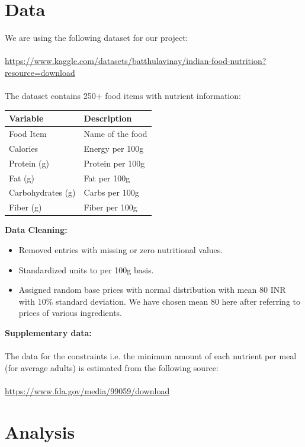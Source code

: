 \documentclass{article}
\begin{document}
\section*{Data}
We are using the following dataset for our project:\\
\\
\href{https://www.kaggle.com/datasets/batthulavinay/indian-food-nutrition?resource=download}{https://www.kaggle.com/datasets/batthulavinay/indian-food-nutrition?resource=download}\\
\\
The dataset contains 250+ food items with nutrient information:
\begin{center}
\begin{tabular}{ll}
\toprule
\textbf{Variable} & \textbf{Description} \\
\midrule
Food Item & Name of the food \\
Calories & Energy per 100g \\
Protein (g) & Protein per 100g \\
Fat (g) & Fat per 100g \\
Carbohydrates (g) & Carbs per 100g \\
Fiber (g) & Fiber per 100g \\
\bottomrule
\end{tabular}
\end{center}

\textbf{Data Cleaning:}
\begin{itemize}
    \item Removed entries with missing or zero nutritional values.
    \item Standardized units to per 100g basis.
    \item Assigned random base prices with normal distribution with mean 80 INR with 10\% standard deviation. We have chosen mean 80 here after referring to prices of various ingredients.
\end{itemize}
\textbf{Supplementary data:}
\\
\\
The data for the constraints i.e. the minimum amount of each nutrient per meal (for average adults) is estimated from the following source:
\\
\\
\href{https://www.fda.gov/media/99059/download}{https://www.fda.gov/media/99059/download}

\section*{Analysis}
\end{document}
